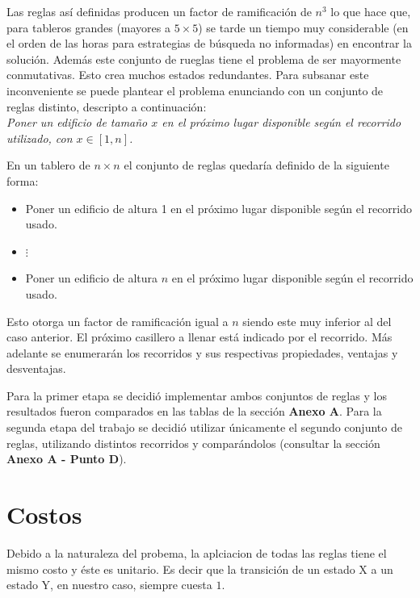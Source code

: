 \documentclass[%
    final,
    reprint,
    notitlepage,
    narroweqnarray,
    inline,
    twoside,
    invited
    ]{ieee}
\begin{document}
\par Las reglas así definidas producen un factor de ramificación de $n^3$ lo que hace que, para tableros grandes (mayores a $5\times5$) se 
tarde un tiempo muy considerable (en el orden de las horas para estrategias de búsqueda no informadas) en encontrar la solución. Además este conjunto de rueglas tiene el problema 
de ser mayormente conmutativas. Esto crea muchos estados redundantes. 
Para subsanar este inconveniente se puede plantear el problema enunciando con un conjunto de reglas distinto, descripto a continuación:\\

\emph{Poner un edificio de tamaño $x$ en el próximo lugar disponible según el recorrido utilizado, con $x \in [1, n]$.}\\

\par En un tablero de $n\times n$ el conjunto de reglas quedaría definido de la siguiente forma:\\

\begin{itemize}
\item Poner un edificio de altura 1 en el próximo lugar disponible según el recorrido usado.
\item $\vdots$
\item Poner un edificio de altura $n$ en el próximo lugar disponible según el recorrido usado.
\end{itemize}

\par Esto otorga un factor de ramificación igual a $n$ siendo este muy inferior al del caso anterior. El próximo casillero a llenar está indicado por 
el recorrido. Más adelante se enumerarán los recorridos y sus respectivas propiedades, ventajas y desventajas. \\
\par Para la primer etapa se decidió implementar ambos conjuntos de reglas y los resultados fueron comparados en las tablas de la sección \textbf{Anexo A}. 
Para la segunda etapa del trabajo se decidió utilizar únicamente el segundo conjunto de reglas, utilizando distintos recorridos y comparándolos (consultar la sección \textbf{Anexo A - Punto D}). 

\section{Costos}

\par Debido a la naturaleza del probema, la aplciacion de todas las reglas tiene el mismo costo y éste es unitario. Es decir que la transición de un estado X a un estado Y, en nuestro caso, siempre cuesta $1$.
\end{document}
